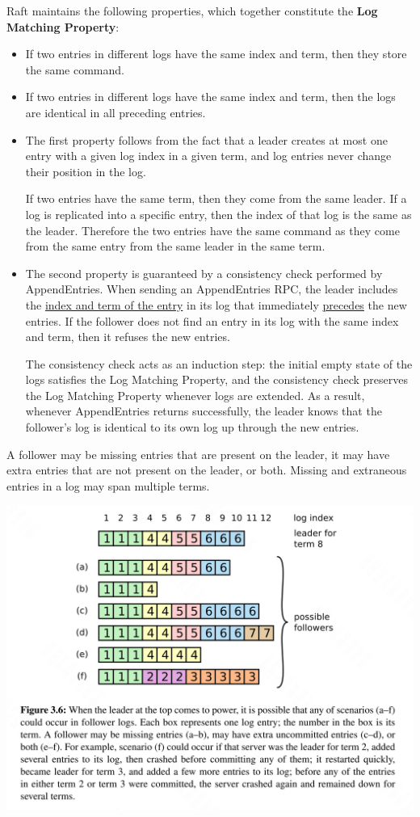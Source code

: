 \documentclass[11pt]{article}
\begin{document}
Raft maintains the following properties, which together constitute the \textbf{Log Matching Property}:
\begin{itemize}
\item If two entries in different logs have the same index and term, then they store the same command.
\item If two entries in different logs have the same index and term, then the logs are identical in all
preceding entries.

\item The first property follows from the fact that a leader creates at most one entry with a given log
index in a given term, and log entries never change their position in the log.

If two entries have the same term, then they come from the same leader. If a log is replicated into
a specific entry, then the index of that log is the same as the leader. Therefore the two entries
have the same command as they come from the same entry from the same leader in the same term.
\item The second property is guaranteed by a consistency check performed by AppendEntries. When sending an
AppendEntries RPC, the leader includes the \uline{index and term of the entry} in its log that immediately
\uline{precedes} the new entries. If the follower does not find an entry in its log with the same index and
term, then it refuses the new entries.

The consistency check acts as an induction step: the initial empty state of the logs satisfies the
Log Matching Property, and the consistency check preserves the Log Matching Property whenever logs
are extended. As a result, whenever AppendEntries returns successfully, the leader knows that the
follower’s log is identical to its own log up through the new entries.
\end{itemize}


A follower may be missing entries that are present on the leader, it may have extra entries that are
not present on the leader, or both. Missing and extraneous entries in a log may span multiple terms.
\begin{center}
\includegraphics[width=.9\textwidth]{../../images/papers/13.png}
\label{3.6}
\end{center}
\end{document}
